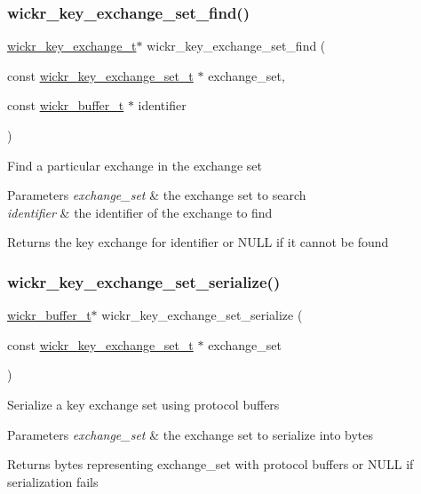 \subsubsection{\texorpdfstring{wickr\_key\_exchange\_set\_find()}{wickr\_key\_exchange\_set\_find()}}
{\footnotesize\ttfamily \mbox{\hyperlink{structwickr__key__exchange}{wickr\+\_\+key\+\_\+exchange\+\_\+t}}$\ast$ wickr\+\_\+key\+\_\+exchange\+\_\+set\+\_\+find (\begin{DoxyParamCaption}\item[{const \mbox{\hyperlink{structwickr__key__exchange__set}{wickr\+\_\+key\+\_\+exchange\+\_\+set\+\_\+t}} $\ast$}]{exchange\+\_\+set,  }\item[{const \mbox{\hyperlink{structwickr__buffer}{wickr\+\_\+buffer\+\_\+t}} $\ast$}]{identifier }\end{DoxyParamCaption})}

Find a particular exchange in the exchange set


\begin{DoxyParams}{Parameters}
{\em exchange\+\_\+set} & the exchange set to search \\
\hline
{\em identifier} & the identifier of the exchange to find \\
\hline
\end{DoxyParams}
\begin{DoxyReturn}{Returns}
the key exchange for \textquotesingle{}identifier\textquotesingle{} or N\+U\+LL if it cannot be found 
\end{DoxyReturn}
\mbox{\label{group__wickr__key__exchange__set_gaf31dcf7493d3eccd4b31b0ff2a79f536}} 
\subsubsection{\texorpdfstring{wickr\_key\_exchange\_set\_serialize()}{wickr\_key\_exchange\_set\_serialize()}}
{\footnotesize\ttfamily \mbox{\hyperlink{structwickr__buffer}{wickr\+\_\+buffer\+\_\+t}}$\ast$ wickr\+\_\+key\+\_\+exchange\+\_\+set\+\_\+serialize (\begin{DoxyParamCaption}\item[{const \mbox{\hyperlink{structwickr__key__exchange__set}{wickr\+\_\+key\+\_\+exchange\+\_\+set\+\_\+t}} $\ast$}]{exchange\+\_\+set }\end{DoxyParamCaption})}

Serialize a key exchange set using protocol buffers


\begin{DoxyParams}{Parameters}
{\em exchange\+\_\+set} & the exchange set to serialize into bytes \\
\hline
\end{DoxyParams}
\begin{DoxyReturn}{Returns}
bytes representing \textquotesingle{}exchange\+\_\+set\textquotesingle{} with protocol buffers or N\+U\+LL if serialization fails 
\end{DoxyReturn}
